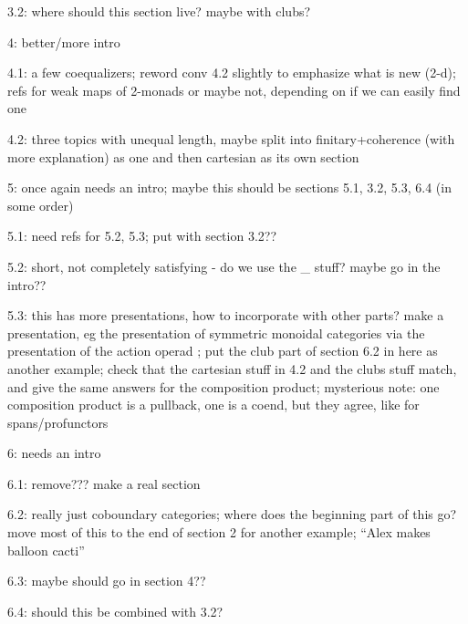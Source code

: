 3.2: where should this section live? maybe with clubs?

4: better/more intro

4.1: a few coequalizers; reword conv 4.2 slightly to emphasize what is new (2-d); refs for weak maps of 2-monads or maybe not, depending on if we can easily find one

4.2: three topics with unequal length, maybe split into finitary+coherence (with more explanation) as one and then cartesian as its own section

5: once again needs an intro; maybe this should be sections 5.1, 3.2, 5.3, 6.4 (in some order)

5.1: need refs for 5.2, 5.3; put with section 3.2??

5.2: short, not completely satisfying - do we use the \Lambda_{\infty} stuff? maybe go in the intro??

5.3: this has more presentations, how to incorporate with other parts? make a presentation, eg the presentation of symmetric monoidal categories via the presentation of the action operad \Sigma; put the club part of section 6.2 in here as another example; check that the cartesian stuff in 4.2 and the clubs stuff match, and give the same answers for the composition product; mysterious note: one composition product is a pullback, one is a coend, but they agree, like for spans/profunctors

6: needs an intro

6.1: remove??? make a real section

6.2: really just coboundary categories; where does the beginning part of this go? move most of this to the end of section 2 for another example; ``Alex makes balloon cacti''

6.3: maybe should go in section 4??

6.4: should this be combined with 3.2?


